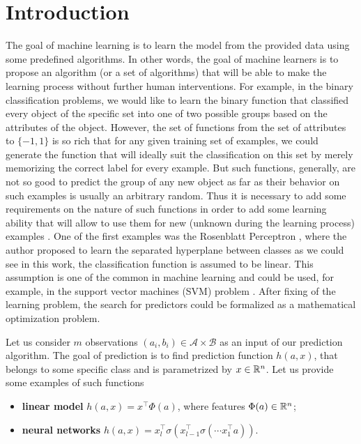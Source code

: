 \section*{Introduction}\label{sec:basics_intro}
The goal of machine learning is to learn the model from the provided data using some predefined algorithms. In other words, the goal of machine learners is to propose an algorithm (or a set of algorithms) that will be able to make the learning process without further human interventions. For example, in the binary classification problems, we would like to learn the binary function that classified every object of the specific set into one of two possible groups based on the attributes of the object. However, the set of functions from the set of attributes to $\{-1,1\}$ is so rich that for any given training set of examples, we could generate the function that will ideally suit the classification on this set by merely memorizing the correct label for every example. But such functions, generally, are not so good to predict the group of any new object as far as their behavior on such examples is usually an arbitrary random. Thus it is necessary to add some requirements on the nature of such functions in order to add some learning ability that will allow to use them for new (unknown during the learning process) examples \cite{vapnik2013nature}. One of the first examples was the Rosenblatt Perceptron \cite{rosenblatt1960perceptron}, where the author proposed to learn the separated hyperplane {between classes} as we could see in this work, the classification function is assumed to be linear. This assumption is one of the common in machine learning and could be used, for example, in the support vector machines (SVM) problem \cite{suykens1999least}. After fixing of the learning problem, the search for predictors could be formalized as a mathematical optimization problem.


Let us consider $m$ observations $(a_i, b_i)\in\mathcal{A}\times\mathcal{B}$ as an input of our prediction algorithm. The goal of prediction is to find prediction function $h(a, x)$, that belongs to some specific class and is parametrized by $x\in\mathbb{R}^n$. Let us provide some examples of such functions
\begin{itemize}
    \item[] {\textbf{linear model}} $h(a,x) = x^\top \Phi(a)$, where features $\Phi(a)\in\mathbb{R}^n$;
    \item[] {\textbf{neural networks}} $h(a,x) = x_l^\top\sigma(x_{l-1}^\top\sigma(\cdots x_1^\top a))$.
\end{itemize}


